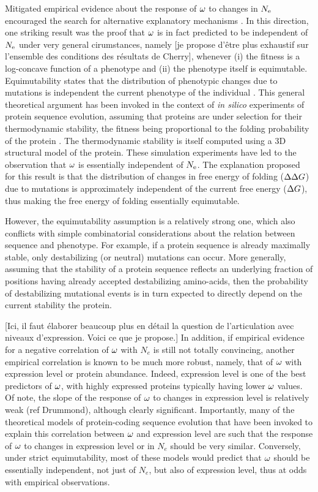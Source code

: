 \documentclass{article}
\begin{document}
	Mitigated empirical evidence about the response of $\omega$ to changes in $N_{\mathrm{e}}$ encouraged the search for alternative explanatory mechanisms \cite{Lanfear2014}.
	In this direction, one striking result was the proof that $\omega$ is in fact predicted to be independent of $N_{\mathrm{e}}$ under very general cirumstances, namely [je propose d'être plus exhaustif sur l'ensemble des conditions des résultats de Cherry], whenever (i) the fitness is a log-concave function of a phenotype and (ii) the phenotype itself is equimutable. Equimutability states that the distribution of phenotypic changes due to mutations is independent the current phenotype of the individual \cite{Cherry1998}.
	This general theoretical argument has been invoked in the context of \textit{in silico} experiments of protein sequence evolution, assuming that proteins are under selection for their thermodynamic stability, the fitness being proportional to the folding probability of the protein \cite{Goldstein2013}. The thermodynamic stability is itself computed using a 3D structural model of the protein. These simulation experiments have led to the observation that $\omega$ is essentially independent of $N_{\mathrm{e}}$. The explanation proposed for this result is that the distribution of changes in free energy of folding ($\Delta \Delta G$) due to mutations is approximately independent of the current free energy ($\Delta G$), thus making the free energy of folding essentially equimutable.
	
	However, the equimutability assumption is a relatively strong one, which also conflicts with simple combinatorial considerations about the relation between sequence and phenotype. For example, if a protein sequence is already maximally stable, only destabilizing (or neutral) mutations can occur. More generally, assuming that the stability of a protein sequence reflects an underlying fraction of positions having already accepted destabilizing amino-acids, then the probability of destabilizing mutational events is in turn expected to directly depend on the current stability the protein.
	
	[Ici, il faut élaborer beaucoup plus en détail la question de l'articulation avec niveaux d'expression. Voici ce que je propose.]
	In addition, if empirical evidence for a negative correlation of $\omega$ with $N_e$ is still not totally convincing, another empirical correlation is known to be much more robust, namely, that of $\omega$ with expression level or protein abundance. Indeed, expression level is one of the best predictors of $\omega$, with highly expressed proteins typically having lower $\omega$ values. Of note, the slope of the response of $\omega$ to changes in expression level is relatively weak (ref Drummond), although clearly significant. Importantly, many of the theoretical models of protein-coding sequence evolution that have been invoked to explain this correlation between $\omega$ and expression level are such that the response of $\omega$ to changes in expression level or in $N_e$ should be very similar. Conversely, under strict equimutability, most of these models would predict that $\omega$ should be essentially independent, not just of $N_e$, but also of expression level, thus at odds with empirical observations.
	
\end{document}
